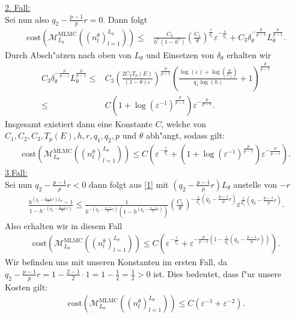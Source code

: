 \underline{2. Fall:}\\
Sei nun also $q_2-\frac{p-1}{p}r=0$. Dann folgt
\begin{align*}
\text{cost}(\mathcal{M}_{L_\theta}^{\text{MLMC}}((n_l^\theta)_{l=1}^{L_\theta}))\leq& \frac{C_3}{h^r(1-h^r)}\left(\frac{C_1}{\theta}\right)^{\frac{r}{q_1}}\varepsilon^{-\frac{r}{q_1}}+C_3\delta_\theta^{-\frac{p}{p-1}}L_\theta^{\frac{p}{p-1}}.
\end{align*}
Durch Absch"atzen nach oben von $L_\theta$ und Einsetzen von $\delta_\theta$ erhalten wir
\begin{align*}
C_3\delta_\theta^{-\frac{p}{p-1}}L_\theta^{\frac{p}{p-1}}\leq& C_3\left(\frac{2C_2T_p(E)}{(1-\theta)\varepsilon}\right)^{\frac{p}{p-1}}\left(\frac{\log(\varepsilon)+\log(\frac{\theta}{C_1})}{q_1\log(h)}+1\right)^{\frac{p}{p-1}}\\
\leq& C(1+\log(\varepsilon^{-1})^{\frac{p}{p-1}})\varepsilon^{-\frac{p}{p-1}}.
\end{align*}
Insgesamt existiert dann eine Konstante $C$, welche von $C_1,C_2,C_3,T_p(E),h,r,q_1,q_2,p$ und $\theta$ abh"angt, sodass gilt:
\begin{align*}
\text{cost}(\mathcal{M}_{L_\theta}^{\text{MLMC}}((n_l^\theta)_{l=1}^{L_\theta}))\leq C(\varepsilon^{-\frac{r}{q_1}}+(1+\log(\varepsilon^{-1})^{\frac{p}{p-1}})\varepsilon^{-\frac{p}{p-1}}).
\end{align*}
\underline{3.Fall:}\\
Sei nun $q_2-\frac{p-1}{p}r<0$ dann folgt aus \eqref{1} mit $(q_2-\frac{p-1}{p}r)L_\theta$ anstelle von $-r$
\begin{align*}
\frac{h^{(q_2-\frac{p-1}{p}r)L_\theta}-1}{1-h^{-(q_2-\frac{p-1}{p}r)}}\leq \frac{1}{h^{-(q_2-\frac{p-1}{p}r)}(1-h^{(q_2-\frac{p-1}{p}r)})}\left(\frac{C_1}{\theta}\right)^{-\frac{1}{q_1}(q_2-\frac{p-1}{p}r)}\varepsilon^{\frac{1}{q_1}(q_2-\frac{p-1}{p}r)}.
\end{align*}
Also erhalten wir in diesem Fall
\begin{align*}
\text{cost}(\mathcal{M}_{L_\theta}^{\text{MLMC}}((n_l^\theta)_{l=1}^{L_\theta}))\leq C\left(\varepsilon^{-\frac{r}{q_1}}+\varepsilon^{-\frac{p}{p-1}(1-\frac{1}{q_1}(q_2-\frac{p-1}{p}r))}\right).
\end{align*}
Wir befinden uns mit unseren Konstanten im ersten Fall, da $q_2-\frac{p-1}{p}r=1- \frac{2-1}{2}\cdot 1 = 1- \frac{1}{2}=\frac{1}{2}>0$ ist. Dies bedeutet, dass f"ur unsere Kosten gilt:
\begin{align*}
\text{cost}(\mathcal{M}_{L_\theta}^{\text{MLMC}}((n_l^\theta)_{l=1}^{L_\theta}))\leq C\left(\varepsilon^{-1}+\varepsilon^{-2}\right).
\end{align*}
